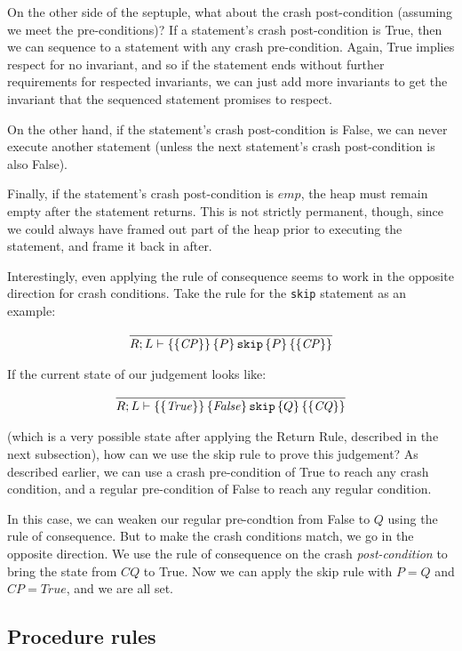 On the other side of the septuple, what about the crash post-condition
(assuming we meet the pre-conditions)? If a statement's crash post-condition
is True, then we can sequence to a statement with any crash pre-condition.
Again, True implies respect for no invariant, and so if the statement ends
without further requirements for respected invariants, we can just add more
invariants to get the invariant that the sequenced statement promises to
respect.

On the other hand, if the statement's crash post-condition is False, we can
never execute another statement (unless the next statement's crash
post-condition is also False).

Finally, if the statement's crash post-condition is $\mathit{emp}$,
the heap must remain
empty after the statement returns.
This is not strictly permanent, though,
since we could always have framed out part of the heap prior to executing the
statement, and frame it back in after.

Interestingly, even applying the rule of consequence seems to work in the
opposite direction for crash conditions.
Take the rule for the \texttt{skip}
statement as an example:

\begin{gather*}
    \infer{\hoarestmt{R}{L}{\mathit{CP}}{P}{\texttt{skip}}{P}{\mathit{CP}}}{}
\end{gather*}

If the current state of our judgement looks like:

\begin{gather*}
\infer{\hoarestmt{R}{L}{\mathit{True}}{\mathit{False}}{\texttt{skip}}{Q}{\mathit{CQ}}}{}
\end{gather*}

(which is a very possible state after applying the Return Rule, described in the
next subsection), how can we use the skip rule to prove this judgement? As
described earlier, we can use a crash pre-condition of True to reach any crash
condition, and a regular pre-condition of False to reach any regular condition.

In this case, we can weaken our regular pre-condtion from False to $Q$
using the rule of consequence.
But to make the crash conditions match, we go in
the opposite direction.
We use the rule of consequence on the crash
\textit{post-condition} to bring the state from $\mathit{CQ}$ to True.
Now we can apply
the skip rule with $P=Q$ and $\mathit{CP}=True$, and we are all set.

\subsection{Procedure rules}
\label{sec:procrules}

